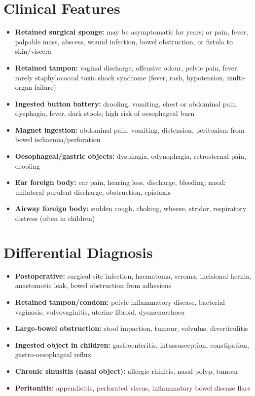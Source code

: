 \section*{Clinical Features}
\begin{itemize}
    \item \textbf{Retained surgical sponge:} may be asymptomatic for years; or pain, fever, palpable mass, abscess, wound infection, bowel obstruction, or fistula to skin/viscera
    \item \textbf{Retained tampon:} vaginal discharge, offensive odour, pelvic pain, fever; rarely staphylococcal toxic shock syndrome (fever, rash, hypotension, multi-organ failure)
    \item \textbf{Ingested button battery:} drooling, vomiting, chest or abdominal pain, dysphagia, fever, dark stools; high risk of oesophageal burn
    \item \textbf{Magnet ingestion:} abdominal pain, vomiting, distension, peritonism from bowel ischaemia/perforation
    \item \textbf{Oesophageal/gastric objects:} dysphagia, odynophagia, retrosternal pain, drooling
    \item \textbf{Ear foreign body:} ear pain, hearing loss, discharge, bleeding; nasal: unilateral purulent discharge, obstruction, epistaxis
    \item \textbf{Airway foreign body:} sudden cough, choking, wheeze, stridor, respiratory distress (often in children)
\end{itemize}

\section*{Differential Diagnosis}
\begin{itemize}
    \item \textbf{Postoperative:} surgical-site infection, haematoma, seroma, incisional hernia, anastomotic leak, bowel obstruction from adhesions
    \item \textbf{Retained tampon/condom:} pelvic inflammatory disease, bacterial vaginosis, vulvovaginitis, uterine fibroid, dysmenorrhoea
    \item \textbf{Large-bowel obstruction:} stool impaction, tumour, volvulus, diverticulitis
    \item \textbf{Ingested object in children:} gastroenteritis, intussusception, constipation, gastro-oesophageal reflux
    \item \textbf{Chronic sinusitis (nasal object):} allergic rhinitis, nasal polyp, tumour
    \item \textbf{Peritonitis:} appendicitis, perforated viscus, inflammatory bowel disease flare
\end{itemize}

